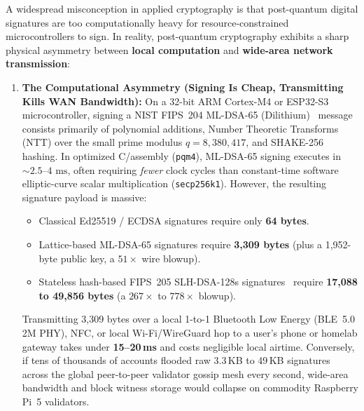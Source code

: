 \documentclass[a4paper,11pt,twoside,parskip=half-,headings=small]{scrartcl}
\newcommand{\code}[1]{\texttt{#1}}
\begin{document}
A widespread misconception in applied cryptography is that post-quantum digital signatures are too computationally heavy for resource-constrained microcontrollers to sign. In reality, post-quantum cryptography exhibits a sharp physical asymmetry between \textbf{local computation} and \textbf{wide-area network transmission}:
\begin{enumerate}[nosep]
  \item \textbf{The Computational Asymmetry (Signing Is Cheap, Transmitting Kills WAN Bandwidth):}
  On a 32-bit ARM Cortex-M4 or ESP32-S3 microcontroller, signing a NIST FIPS~204 ML-DSA-65 (Dilithium)~\cite{fips204} message consists primarily of polynomial additions, Number Theoretic Transforms (NTT) over the small prime modulus $q = 8{,}380{,}417$, and SHAKE-256 hashing. In optimized C/assembly (\code{pqm4}), ML-DSA-65 signing executes in $\sim 2.5\text{--}4\text{ ms}$, often requiring \emph{fewer} clock cycles than constant-time software elliptic-curve scalar multiplication (\code{secp256k1}). However, the resulting signature payload is massive:
  \begin{itemize}[nosep]
    \item Classical Ed25519 / ECDSA signatures require only \textbf{64 bytes}.
    \item Lattice-based ML-DSA-65 signatures require \textbf{3,309 bytes} (plus a 1,952-byte public key, a $51\times$ wire blowup).
    \item Stateless hash-based FIPS~205 SLH-DSA-128s signatures~\cite{fips205} require \textbf{17,088 to 49,856 bytes} (a $267\times$ to $778\times$ blowup).
  \end{itemize}
  Transmitting 3,309 bytes over a local 1-to-1 Bluetooth Low Energy (BLE~5.0 2M PHY), NFC, or local Wi-Fi/WireGuard hop to a user's phone or homelab gateway takes under \textbf{15--20\,ms} and costs negligible local airtime. Conversely, if tens of thousands of accounts flooded raw 3.3\,KB to 49\,KB signatures across the global peer-to-peer validator gossip mesh every second, wide-area bandwidth and block witness storage would collapse on commodity Raspberry Pi~5 validators.


\end{enumerate}
\end{document}
